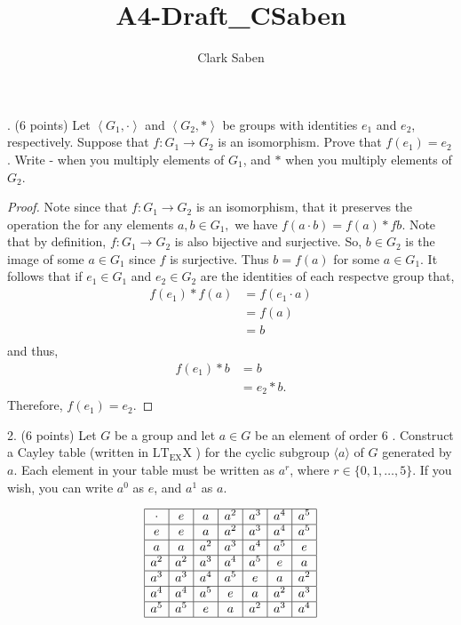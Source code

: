 \documentclass[12pt]{article}
\begin{document}
 
 
\title{A4-Draft\_CSaben}
\author{Clark Saben}

 
. (6 points) Let $\left\langle G_{1}, \cdot\right\rangle$ and 
	$\left\langle G_{2}, *\right\rangle$ be groups with identities 
	$e_{1}$ and $e_{2}$, respectively. 
	Suppose that $f: G_{1} \rightarrow G_{2}$ is an isomorphism. 
	Prove that $f\left(e_{1}\right)=e_{2}$. Write - when you 
	multiply elements of $G_{1}$, and $*$ when you multiply elements of $G_{2}$.

\begin{proof}{1} 
	Note since that $f: G_{1} \rightarrow G_{2}$ is an isomorphism,
	that it preserves the operation the for any elements 
	$a,b \in G_1, $ we have $f(a \cdot b) = f(a)*f{b}$.
	Note that by definition, $f: G_{1} \rightarrow G_{2}$ is also bijective and surjective.
	So, $b \in G_2$ is the image of some $a \in G_1$ since 
	$f$ is surjective. Thus $b = f(a)$ for some $a \in G_1$.
	It follows that if $e_1 \in G_1$ and $e_2 \in G_2$ are the identities
	of each respectve group that,
	$$
	\begin{aligned}
		f(e_1)*f(a) &= f(e_1 \cdot a) \\
			    &= f(a) \\
			    &= b \\
	\end{aligned}
	$$
	and thus,
	$$
	\begin{aligned}
		f(e_1)*b &= b \\
			 &= e_2 * b. 
	\end{aligned}
	$$
	Therefore, $f(e_1)=e_2$. 
\end{proof}

2. (6 points) Let $G$ be a group and let $a \in G$ be an element of order 6 . Construct a Cayley table (written in $\mathrm{LT}_{\mathrm{EX}} \mathrm{X}$ ) for the cyclic subgroup $\langle a\rangle$ of $G$ generated by $a$. Each element in your table must be written as $a^{r}$, where $r \in\{0,1, \ldots, 5\}$. If you wish, you can write $a^{0}$ as $e$, and $a^{1}$ as $a$.

$$
\begin{array}{|c|c|c|c|c|c|c|}
\hline
\cdot & e & a & a^2 & a^3 & a^4 & a^5 \\
\hline
e & e & a & a^2 & a^3 & a^4 & a^5 \\
\hline
a & a & a^2 & a^3 & a^4 & a^5 & e \\
\hline
a^2 & a^2 & a^3 & a^4 & a^5 & e & a \\
\hline
a^3 & a^3 & a^4 & a^5 & e & a & a^2 \\
\hline
a^4 & a^4 & a^5 & e & a & a^2 & a^3 \\
\hline
a^5 & a^5 & e & a & a^2 & a^3 & a^4 \\
\hline
\end{array}
$$
\end{document}
